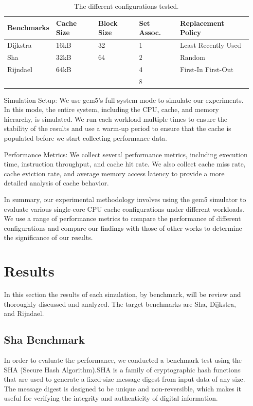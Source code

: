 \documentclass[conference]{IEEEtran}
\begin{document}
\begin{table}[H]
  \centering
  \begin{tabular}{| m{1.6cm} | m{.75cm} | m{.75cm} | m{.8cm} | m{2.6cm} |}
      \hline
      \textbf{Benchmarks} & \textbf{Cache Size} & \textbf{Block Size}& \textbf{Set Assoc.}& \textbf{Replacement Policy} \\ \hline
      Dijkstra    &   16kB  &   32    &  1   &    Least Recently Used     \\ \hline
      Sha         &   32kB  &   64    &  2   &    Random                  \\ \hline
      Rijndael    &   64kB  &         &  4   &    First-In First-Out      \\ \hline
                  &         &         &  8   &                            \\ \hline
  \end{tabular}
  \caption{The different configurations tested.}
  \label{table:configurations}
\end{table}

Simulation Setup:
We use gem5's full-system mode to simulate our experiments. In this mode, the entire system, including the CPU, cache, and memory hierarchy, is simulated. We run each workload multiple times to ensure the stability of the results and use a warm-up period to ensure that the cache is populated before we start collecting performance data.

Performance Metrics:
We collect several performance metrics, including execution time, instruction throughput, and cache hit rate. We also collect cache miss rate, cache eviction rate, and average memory access latency to provide a more detailed analysis of cache behavior.

In summary, our experimental methodology involves using the gem5 simulator to evaluate various single-core CPU cache configurations under different workloads. We use a range of performance metrics to compare the performance of different configurations and compare our findings with those of other works to determine the significance of our results.

\section{Results}
In this section the results of each simulation, by benchmark, will be review and thoroughly discussed and analyzed. The target benchmarks are Sha, Dijkstra, and Rijndael.

\subsection{Sha Benchmark}
In order to evaluate the performance, we conducted a benchmark test using the SHA (Secure Hash Algorithm).SHA is a family of cryptographic hash functions that are used to generate a fixed-size message digest from input data of any size. The message digest is designed to be unique and non-reversible, which makes it useful for verifying the integrity and authenticity of digital information.
\end{document}
